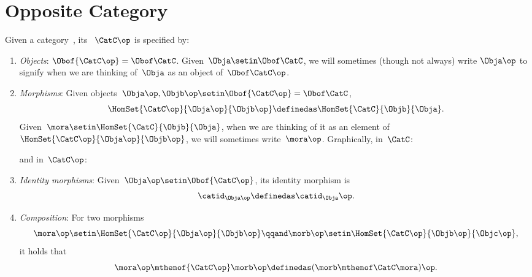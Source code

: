 
\section{Opposite Category}

\begin{ctdefinition}
    \label{def:opposite-category}
    \label{def:oppositecat}
    Given a category~\CatC, its \emph{}~$\CatC\op$ is specified by:
    \begin{enumerate}
        \item \emph{Objects}: $\Obof{\CatC\op} = \Obof\CatC$.
              Given~$\Obja \setin  \Obof\CatC$, we will sometimes (though not always) write $\Obja\op$ to signify when we are thinking of~$\Obja$ as an object of~$\Obof\CatC\op$.

        \item \emph{Morphisms}: Given objects~$\Obja\op,  \Objb\op \setin \Obof{\CatC\op} = \Obof\CatC$,
              \begin{equation}
                  \label{eq:homset-op-cat}
                  \HomSet{\CatC\op}{\Obja\op}{\Objb\op} \definedas \HomSet{\CatC}{\Objb}{\Obja}.
              \end{equation}
              Given~$\mora \setin \HomSet{\CatC}{\Objb}{\Obja}$, when we are thinking of it as an element of $\HomSet{\CatC\op}{\Obja\op}{\Objb\op}$, we will sometimes write~$\mora\op$.
              Graphically, in~$\CatC$:
              \begin{center}
              \end{center}
              and in~$\CatC\op$:
              \begin{center}
              \end{center}
        \item \emph{Identity morphisms}: Given~$\Obja\op \setin \Obof{\CatC\op}$, its identity morphism is
              \begin{equation}
                  \catid_{\Obja\op} \definedas \catid_{\Obja}\op.
              \end{equation}
        \item \emph{Composition}: For two morphisms
              \begin{equation}
                  \mora\op \setin \HomSet{\CatC\op}{\Obja\op}{\Objb\op}
                  \qqand
                  \morb\op \setin \HomSet{\CatC\op}{\Objb\op}{\Objc\op},
              \end{equation}
              it holds that
              \begin{equation}
                  \mora\op \mthenof{\CatC\op} \morb\op \definedas (\morb \mthenof\CatC \mora)\op.
              \end{equation}
    \end{enumerate}
\end{ctdefinition}

